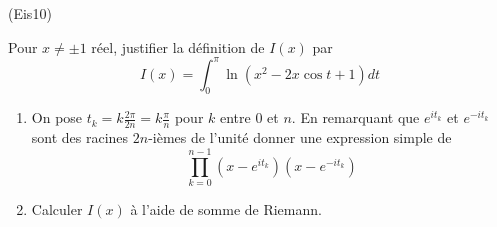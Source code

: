 \begin{tiny}(Eis10)\end{tiny}
Pour $x\neq \pm 1$ réel, justifier la définition de $I(x)$ par
\begin{displaymath}
I(x) = \int_{0}^{\pi }\ln (x^{2}-2x\cos t+1)dt 
\end{displaymath}
\begin{enumerate}
 \item On pose $t_k=k\frac{2\pi}{2n}=k\frac{\pi}{n}$ pour $k$ entre $0$ et $n$. En remarquant que $e^{it_k}$ et $e^{-it_k}$ sont des racines $2n$-ièmes de l'unité donner une expression simple de
\begin{displaymath}
 \prod_{k=0}^{n-1}(x-e^{it_k})(x-e^{-it_k})
\end{displaymath}

 \item Calculer $I(x)$ à l'aide de somme de Riemann.
\end{enumerate}
